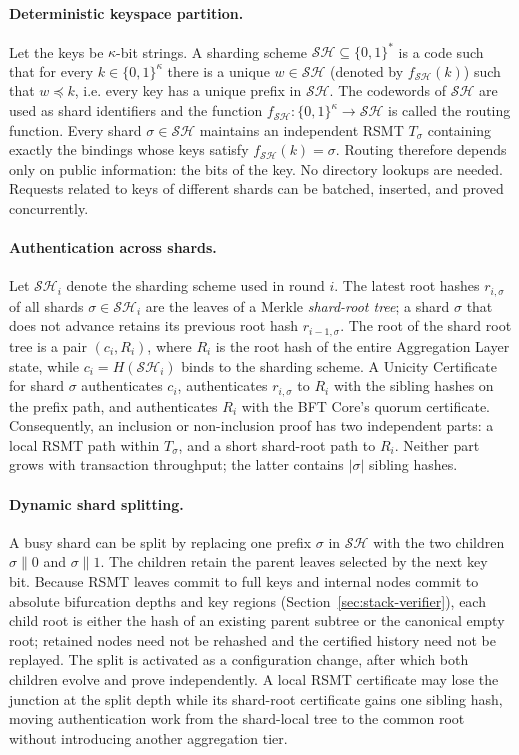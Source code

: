 \documentclass[11pt]{article}
\begin{document}
\paragraph{Deterministic keyspace partition.}
Let the keys be $\kappa$-bit strings. A sharding scheme $\mathcal{SH}\subseteq\{0,1\}^{*}$ is a code such that for every $k\in\{0,1\}^\kappa$ there is a unique $w\in\mathcal{SH}$ (denoted by $f_{\mathcal{SH}}(k)$) such that $w\preceq k$, i.e.
every key has a unique prefix in $\mathcal{SH}$. The codewords of $\mathcal{SH}$ are used as shard identifiers and the function
$f_{\mathcal{SH}}\colon \{0,1\}^\kappa\rightarrow \mathcal{SH}$ is called the routing function.
Every shard $\sigma\in\mathcal{SH}$ maintains an independent RSMT $T_\sigma$ containing exactly the bindings whose keys satisfy $f_{\mathcal{SH}}(k)=\sigma$. Routing therefore depends only on public information: the bits of the key. No directory lookups are needed. Requests related to keys of different shards can be batched, inserted, and proved concurrently.

\paragraph{Authentication across shards.}
Let $\mathcal{SH}_i$ denote the sharding scheme used in round $i$. The latest root hashes $r_{i,\sigma}$ of all shards $\sigma\in\mathcal{SH}_i$ are the leaves of a Merkle \emph{shard-root tree}; a shard $\sigma$ that does not advance retains its previous root hash $r_{i-1,\sigma}$. The root of the shard root tree is a pair $(c_i,R_i)$, where $R_i$ is the root hash of the entire Aggregation Layer state, while $c_i=H(\mathcal{SH}_i)$ binds to the sharding scheme. A Unicity Certificate for shard $\sigma$ authenticates $c_i$, authenticates $r_{i,\sigma}$ to $R_i$ with the sibling hashes on the prefix path, and authenticates $R_i$ with the BFT Core's quorum certificate. Consequently, an inclusion or non-inclusion proof has two independent parts: a local RSMT path within $T_\sigma$, and a short shard-root path to $R_i$. Neither part grows with transaction throughput; the latter contains $|\sigma|$ sibling hashes.

\paragraph{Dynamic shard splitting.}
A busy shard can be split by replacing one prefix $\sigma$ in $\mathcal{SH}$ with the two children $\sigma\|0$ and $\sigma\|1$. The children retain the parent leaves selected by the next key bit. Because RSMT leaves commit to full keys and internal nodes commit to absolute bifurcation depths and key regions (Section~\ref{sec:stack-verifier}), each child root is either the hash of an existing parent subtree or the canonical empty root; retained nodes need not be rehashed and the certified history need not be replayed. The split is activated as a configuration change, after which both children evolve and prove independently. A local RSMT certificate may lose the junction at the split depth while its shard-root certificate gains one sibling hash, moving authentication work from the shard-local tree to the common root without introducing another aggregation tier.
\end{document}
